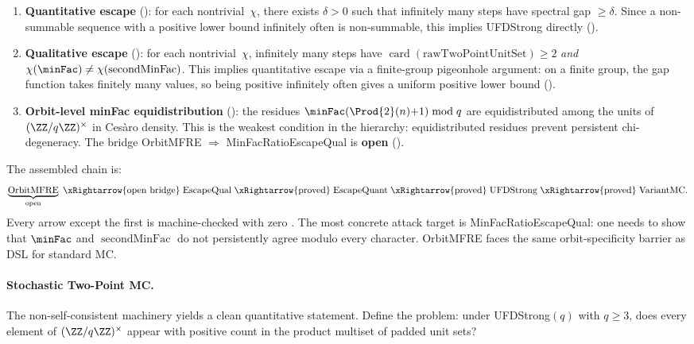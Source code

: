 \begin{enumerate}[nosep]
\item \textbf{Quantitative escape} ():
  for each nontrivial~$\chi$, there exists $\delta > 0$ such that
  infinitely many steps have spectral gap $\geq \delta$.
  Since a non-summable sequence with a positive lower bound infinitely
  often is non-summable, this implies UFDStrong directly
  ().

\item \textbf{Qualitative escape} ():
  for each nontrivial~$\chi$, infinitely many steps have
  $\operatorname{card}(\text{rawTwoPointUnitSet}) \geq 2$ \emph{and}
  $\chi(\minFac) \neq \chi(\operatorname{secondMinFac})$.
  This implies quantitative escape via a finite-group pigeonhole
  argument: on a finite group, the gap function takes finitely many
  values, so being positive infinitely often gives a uniform positive
  lower bound
  ().

\item \textbf{Orbit-level minFac equidistribution} ():
  the residues $\minFac(\Prod{2}(n){+}1) \bmod q$ are equidistributed
  among the units of $(\ZZ/q\ZZ)^\times$ in Cesàro density.
  This is the weakest condition in the hierarchy: equidistributed
  residues prevent persistent chi-degeneracy.  The bridge
  OrbitMFRE $\Rightarrow$ MinFacRatioEscapeQual is \textbf{open}
  ().
\end{enumerate}

The assembled chain is:
\[
  \underbrace{\mathrm{OrbitMFRE}}_{\text{open}}
  \;\xRightarrow{\text{open bridge}}\;
  \mathrm{EscapeQual}
  \;\xRightarrow{\text{proved}}\;
  \mathrm{EscapeQuant}
  \;\xRightarrow{\text{proved}}\;
  \mathrm{UFDStrong}
  \;\xRightarrow{\text{proved}}\;
  \mathrm{VariantMC}.
\]
Every arrow except the first is machine-checked with zero .
The most concrete attack target is MinFacRatioEscapeQual: one needs to
show that $\minFac$ and $\operatorname{secondMinFac}$ do not
persistently agree modulo every character.  OrbitMFRE faces the same
orbit-specificity barrier as DSL for standard MC.

\paragraph{Stochastic Two-Point MC.}
The non-self-consistent machinery yields a clean quantitative statement.
Define the  problem: under UFDStrong$(q)$
with $q \geq 3$, does every element of $(\ZZ/q\ZZ)^\times$ appear with
positive count in the product multiset of padded unit sets?

